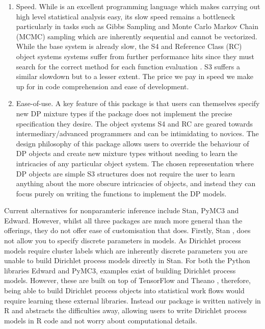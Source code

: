 \documentclass[nojss]{jss}
\begin{document}
\begin{enumerate}
\item Speed. While  is an excellent programming language which makes carrying out high level statistical analysis easy, its slow speed remains a bottleneck particularly in tasks such as Gibbs Sampling and Monte Carlo Markov Chain (MCMC) sampling which are inherently sequential and cannot be vectorized. While the base  system is already slow, the S4 and Reference Class (RC) object systems systems suffer from further performance hits since they must search for the correct method for each function evaluation \citep{wickham_advanced_2014}. S3 suffers a similar slowdown but to a lesser extent. The price we pay in speed we make up for in code comprehension and ease of development.

\item Ease-of-use. A key feature of this package is that users can themselves specify new DP mixture types if the package does not implement the precise specification they desire.  The object systems S4 and RC are geared towards intermediary/advanced  programmers and can be intimidating to novices. The design philosophy of this package allows  users to override the behaviour of DP objects and create new mixture types without needing to learn the intricacies of any particular object system.  The chosen representation where DP objects are simple S3 structures does not require the user to learn anything about the more obscure intricacies of  objects, and instead they can focus purely on writing the  functions to implement the DP models.
\end{enumerate}

Current alternatives for nonparamteric inference include Stan, PyMC3 and Edward. However, whilst all three packages are much more general than the  offerings, they do not offer ease of customisation that  does. Firstly, Stan \citep{carpenter_bob_stan:_2016}, does not allow you to specify discrete parameters in models. As Dirichlet process models require cluster labels which are inherently discrete parameters you are unable to build Dirichlet process models directly in Stan. For both the Python libraries Edward and PyMC3, examples exist of building Dirichlet process models. However, these are built on top of TensorFlow and Theano \citep{tran_edward:_2016, salvatier_probabilistic_2016}, therefore, being able to build Dirichlet process objects into statistical work flows would require learning these external libraries. Instead our package  is written natively in R and abstracts the difficulties away, allowing users to write Dirichlet process models in R code and not worry about computational details.
\end{document}
